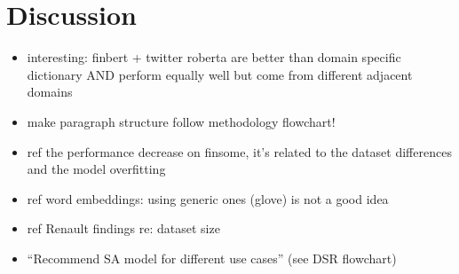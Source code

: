 \section{Discussion}

\begin{itemize}[noitemsep]
	\item interesting: finbert + twitter roberta are better than domain specific dictionary AND perform equally well but come from different adjacent domains
	\item make paragraph structure follow methodology flowchart!
	\item ref the performance decrease on finsome, it's related to the dataset differences and the model overfitting
	\item ref word embeddings: using generic ones (glove) is not a good idea
	\item ref Renault findings re: dataset size
	\item ``Recommend SA model for different use cases'' (see DSR flowchart)
\end{itemize}